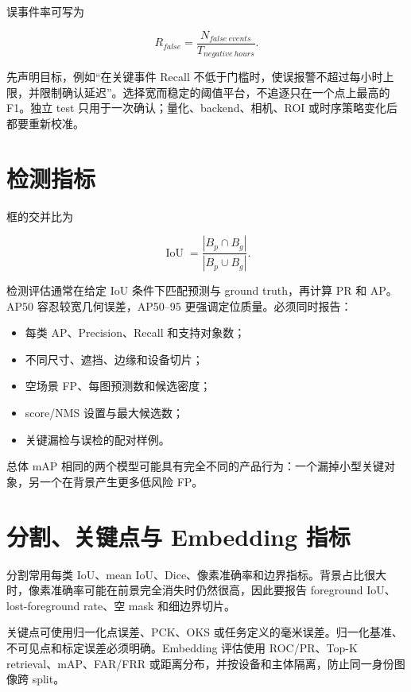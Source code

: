 误事件率可写为

\begin{equation}
  R_{false}=\frac{N_{false\ events}}{T_{negative\ hours}}.
\end{equation}

先声明目标，例如“在关键事件 Recall 不低于门槛时，使误报警不超过每小时上限，并限制确认延迟”。选择宽而稳定的阈值平台，不追逐只在一个点上最高的 F1。独立 test 只用于一次确认；量化、backend、相机、ROI 或时序策略变化后都要重新校准。

\section{检测指标}

框的交并比为

\begin{equation}
  \operatorname{IoU}=\frac{|B_p\cap B_g|}{|B_p\cup B_g|}.
\end{equation}

检测评估通常在给定 IoU 条件下匹配预测与 ground truth，再计算 PR 和 AP。AP50 容忍较宽几何误差，AP50--95 更强调定位质量。必须同时报告：

\begin{itemize}
  \item 每类 AP、Precision、Recall 和支持对象数；
  \item 不同尺寸、遮挡、边缘和设备切片；
  \item 空场景 FP、每图预测数和候选密度；
  \item score/NMS 设置与最大候选数；
  \item 关键漏检与误检的配对样例。
\end{itemize}

总体 mAP 相同的两个模型可能具有完全不同的产品行为：一个漏掉小型关键对象，另一个在背景产生更多低风险 FP。

\section{分割、关键点与 Embedding 指标}

分割常用每类 IoU、mean IoU、Dice、像素准确率和边界指标。背景占比很大时，像素准确率可能在前景完全消失时仍然很高，因此要报告 foreground IoU、lost-foreground rate、空 mask 和细边界切片。

关键点可使用归一化点误差、PCK、OKS 或任务定义的毫米误差。归一化基准、不可见点和标定误差必须明确。Embedding 评估使用 ROC/PR、Top-K retrieval、mAP、FAR/FRR 或距离分布，并按设备和主体隔离，防止同一身份图像跨 split。


